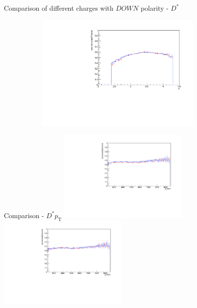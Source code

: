 \documentclass[11pt]{beamer}
\begin{document}
\begin{frame}{Comparison of different charges with $DOWN$ polarity - $D^*$}
\begin{figure}
\begin{subfigure}{0.45\textwidth}
\end{subfigure}
\begin{subfigure}{0.45\textwidth}
\includegraphics[width=0.9\textwidth]{down_pdf/combined/h_eta_reco_Dst.pdf}
\end{subfigure}
\end{figure}
\end{frame}
\begin{frame}{Comparison - $D^* p_\text{T}$}
\centering
\includegraphics[width=0.48\textwidth]{up_pdf/combined/h_pt_reco_Dst.pdf}
\includegraphics[width=0.48\textwidth]{down_pdf/combined/h_pt_reco_Dst.pdf}
\end{frame}
\end{document}
